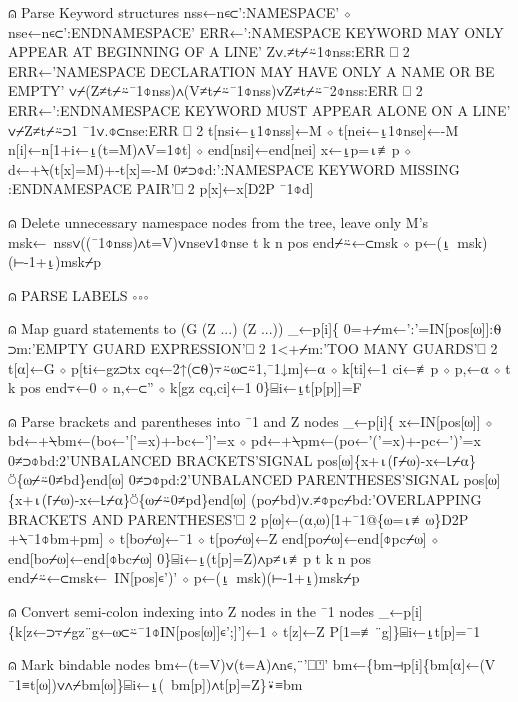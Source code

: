 \documentclass{article}%
\begin{document}
⍝ Parse Keyword structures
         nss←n∊⊂':NAMESPACE' ⋄ nse←n∊⊂':ENDNAMESPACE'
         ERR←':NAMESPACE KEYWORD MAY ONLY APPEAR AT BEGINNING OF A LINE'
         Z∨.≠t⌿⍨1⌽nss:ERR ⎕ 2
         ERR←'NAMESPACE DECLARATION MAY HAVE ONLY A NAME OR BE EMPTY'
         ∨⌿(Z≠t⌿⍨¯1⌽nss)∧(V≠t⌿⍨¯1⌽nss)∨Z≠t⌿⍨¯2⌽nss:ERR ⎕ 2
         ERR←':ENDNAMESPACE KEYWORD MUST APPEAR ALONE ON A LINE'
         ∨⌿Z≠t⌿⍨⊃1 ¯1∨.⌽⊂nse:ERR ⎕ 2
         t[nsi←⍸1⌽nss]←M ⋄ t[nei←⍸1⌽nse]←-M
         n[i]←n[1+i←⍸(t=M)∧V=1⌽t] ⋄ end[nsi]←end[nei]
         x←⍸p=⍳≢p ⋄ d←+⍀(t[x]=M)+-t[x]=-M
         0≠⊃⌽d:':NAMESPACE KEYWORD MISSING :ENDNAMESPACE PAIR'⎕ 2
         p[x]←x[D2P ¯1⌽d]

⍝ Delete unnecessary namespace nodes from the tree, leave only M's
         msk←~nss∨((¯1⌽nss)∧t=V)∨nse∨1⌽nse
         t k n pos end⌿⍨←⊂msk ⋄ p←(⍸~msk)(⊢-1+⍸)msk⌿p

⍝ PARSE LABELS ∘∘∘

⍝ Map guard statements to (G (Z ...) (Z ...))
         _←p[i]\{
                 0=+⌿m←':'=IN[pos[⍵]]:⍬
                 ⊃m:'EMPTY GUARD  EXPRESSION'⎕ 2
                 1<+⌿m:'TOO MANY GUARDS'⎕ 2
                 t[⍺]←G ⋄ p[ti←gz⊃tx cq←2↑(⊂⍬)⍪⍨⍵⊂⍨1,¯1↓m]←⍺ ⋄ k[ti]←1
                 ci←≢p ⋄ p,←⍺ ⋄ t k pos end⍪←0 ⋄ n,←⊂'' ⋄ k[gz cq,ci]←1
         0\}⌸i←⍸t[p[p]]=F

⍝ Parse brackets and parentheses into ¯1 and Z nodes
         _←p[i]\{
                 x←IN[pos[⍵]] ⋄ bd←+⍀bm←(bo←'['=x)+-bc←']'=x ⋄ pd←+⍀pm←(po←'('=x)+-pc←')'=x
                 0≠⊃⌽bd:2'UNBALANCED BRACKETS'SIGNAL pos[⍵]\{x+⍳(⌈⌿⍵)-x←⌊⌿⍺\}⍥\{⍵⌿⍨0≠bd\}end[⍵]
                 0≠⊃⌽pd:2'UNBALANCED PARENTHESES'SIGNAL pos[⍵]\{x+⍳(⌈⌿⍵)-x←⌊⌿⍺\}⍥\{⍵⌿⍨0≠pd\}end[⍵]
                 (po⌿bd)∨.≠⌽pc⌿bd:'OVERLAPPING BRACKETS AND PARENTHESES'⎕ 2
                 p[⍵]←(⍺,⍵)[1+¯1@\{⍵=⍳≢⍵\}D2P +⍀¯1⌽bm+pm] ⋄ t[bo⌿⍵]←¯1 ⋄ t[po⌿⍵]←Z
                 end[po⌿⍵]←end[⌽pc⌿⍵] ⋄ end[bo⌿⍵]←end[⌽bc⌿⍵]
         0\}⌸i←⍸(t[p]=Z)∧p≠⍳≢p
         t k n pos end⌿⍨←⊂msk←~IN[pos]∊')' ⋄ p←(⍸~msk)(⊢-1+⍸)msk⌿p

⍝ Convert semi-colon indexing into Z nodes in the ¯1 nodes
         _←p[i]\{k[z←⊃⍪⌿gz¨g←⍵⊂⍨¯1⌽IN[pos[⍵]]∊';]']←1 ⋄ t[z]←Z P[1=≢¨g]\}⌸i←⍸t[p]=¯1

⍝ Mark bindable nodes
         bm←(t=V)∨(t=A)∧n∊,¨'⎕⍞'
         bm←\{bm⊣p[i]\{bm[⍺]←(V ¯1≡t[⍵])∨∧⌿bm[⍵]\}⌸i←⍸(~bm[p])∧t[p]=Z\}⍣≡bm
\end{document}
